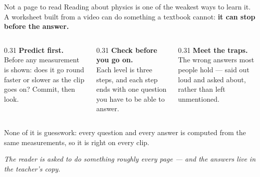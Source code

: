 \documentclass[aspectratio=169,11pt]{beamer}
\newcommand{\takeaway}[1]{\vfill{\small\itshape\color{cGrey}#1\par}}
\begin{document}
\begin{frame}{Not a page to read}
\vspace{2pt}
\small
Reading about physics is one of the weakest ways to learn it. A worksheet built from a video can do
something a textbook cannot: \textbf{it can stop before the answer.}
\vspace{10pt}

\begin{columns}[T]
\begin{column}{0.31\textwidth}
\textbf{\color{cApp}Predict first.}\\[4pt]
{\small Before any measurement is shown: does it go round faster or slower as the clip goes on?
Commit, then look.}
\end{column}
\begin{column}{0.31\textwidth}
\textbf{\color{cApp}Check before you go on.}\\[4pt]
{\small Each level is three steps, and each step ends with one question you have to be able to
answer.}
\end{column}
\begin{column}{0.31\textwidth}
\textbf{\color{cApp}Meet the traps.}\\[4pt]
{\small The wrong answers most people hold --- said out loud and asked about, rather than left
unmentioned.}
\end{column}
\end{columns}
\vspace{10pt}

{\color{cGrey}\small None of it is guesswork: every question and every answer is computed from the
same measurements, so it is right on every clip.}
\takeaway{The reader is asked to do something roughly every page --- and the answers live in the
teacher's copy.}
\end{frame}
\end{document}
